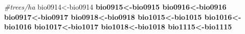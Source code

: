 \documentclass[
]{article}
\newenvironment{Shaded}{\begin{snugshade}}{\end{snugshade}}
\newcommand{\CommentTok}[1]{\textcolor[rgb]{0.56,0.35,0.01}{\textit{#1}}}
\newcommand{\DataTypeTok}[1]{\textcolor[rgb]{0.13,0.29,0.53}{#1}}
\newcommand{\FloatTok}[1]{\textcolor[rgb]{0.00,0.00,0.81}{#1}}
\newcommand{\KeywordTok}[1]{\textcolor[rgb]{0.13,0.29,0.53}{\textbf{#1}}}
\newcommand{\NormalTok}[1]{#1}
\newcommand{\OperatorTok}[1]{\textcolor[rgb]{0.81,0.36,0.00}{\textbf{#1}}}
\newcommand{\StringTok}[1]{\textcolor[rgb]{0.31,0.60,0.02}{#1}}
\begin{document}
\begin{Shaded}
\begin{Highlighting}[]
\CommentTok{#trees/ha}
\NormalTok{bio0914<-bio0914 }\OperatorTok{%>%}\StringTok{  }\KeywordTok{group_by}\NormalTok{(COUNTY_PLOT_SUB) }\OperatorTok{%>%}\StringTok{ }\KeywordTok{mutate}\NormalTok{(}\DataTypeTok{tpha=}\KeywordTok{n}\NormalTok{()}\OperatorTok{/}\FloatTok{0.0168}\NormalTok{)}
\NormalTok{bio0915<-bio0915 }\OperatorTok{%>%}\StringTok{  }\KeywordTok{group_by}\NormalTok{(COUNTY_PLOT_SUB) }\OperatorTok{%>%}\StringTok{ }\KeywordTok{mutate}\NormalTok{(}\DataTypeTok{tpha=}\KeywordTok{n}\NormalTok{()}\OperatorTok{/}\FloatTok{0.0168}\NormalTok{)}
\NormalTok{bio0916<-bio0916 }\OperatorTok{%>%}\StringTok{  }\KeywordTok{group_by}\NormalTok{(COUNTY_PLOT_SUB) }\OperatorTok{%>%}\StringTok{ }\KeywordTok{mutate}\NormalTok{(}\DataTypeTok{tpha=}\KeywordTok{n}\NormalTok{()}\OperatorTok{/}\FloatTok{0.0168}\NormalTok{)}
\NormalTok{bio0917<-bio0917 }\OperatorTok{%>%}\StringTok{  }\KeywordTok{group_by}\NormalTok{(COUNTY_PLOT_SUB) }\OperatorTok{%>%}\StringTok{ }\KeywordTok{mutate}\NormalTok{(}\DataTypeTok{tpha=}\KeywordTok{n}\NormalTok{()}\OperatorTok{/}\FloatTok{0.0168}\NormalTok{)}
\NormalTok{bio0918<-bio0918 }\OperatorTok{%>%}\StringTok{  }\KeywordTok{group_by}\NormalTok{(COUNTY_PLOT_SUB) }\OperatorTok{%>%}\StringTok{ }\KeywordTok{mutate}\NormalTok{(}\DataTypeTok{tpha=}\KeywordTok{n}\NormalTok{()}\OperatorTok{/}\FloatTok{0.0168}\NormalTok{)}
\NormalTok{bio1015<-bio1015 }\OperatorTok{%>%}\StringTok{  }\KeywordTok{group_by}\NormalTok{(COUNTY_PLOT_SUB) }\OperatorTok{%>%}\StringTok{ }\KeywordTok{mutate}\NormalTok{(}\DataTypeTok{tpha=}\KeywordTok{n}\NormalTok{()}\OperatorTok{/}\FloatTok{0.0168}\NormalTok{)}
\NormalTok{bio1016<-bio1016 }\OperatorTok{%>%}\StringTok{  }\KeywordTok{group_by}\NormalTok{(COUNTY_PLOT_SUB) }\OperatorTok{%>%}\StringTok{ }\KeywordTok{mutate}\NormalTok{(}\DataTypeTok{tpha=}\KeywordTok{n}\NormalTok{()}\OperatorTok{/}\FloatTok{0.0168}\NormalTok{)}
\NormalTok{bio1017<-bio1017 }\OperatorTok{%>%}\StringTok{  }\KeywordTok{group_by}\NormalTok{(COUNTY_PLOT_SUB) }\OperatorTok{%>%}\StringTok{ }\KeywordTok{mutate}\NormalTok{(}\DataTypeTok{tpha=}\KeywordTok{n}\NormalTok{()}\OperatorTok{/}\FloatTok{0.0168}\NormalTok{)}
\NormalTok{bio1018<-bio1018 }\OperatorTok{%>%}\StringTok{  }\KeywordTok{group_by}\NormalTok{(COUNTY_PLOT_SUB) }\OperatorTok{%>%}\StringTok{ }\KeywordTok{mutate}\NormalTok{(}\DataTypeTok{tpha=}\KeywordTok{n}\NormalTok{()}\OperatorTok{/}\FloatTok{0.0168}\NormalTok{)}
\NormalTok{bio1115<-bio1115 }\OperatorTok{%>%}\StringTok{  }\KeywordTok{group_by}\NormalTok{(COUNTY_PLOT_SUB) }\OperatorTok{%>%}\StringTok{ }\KeywordTok{mutate}\NormalTok{(}\DataTypeTok{tpha=}\KeywordTok{n}\NormalTok{()}\OperatorTok{/}\FloatTok{0.0168}\NormalTok{)}
}}}}}}}}}}
\end{Highlighting}
\end{Shaded}
\end{document}
